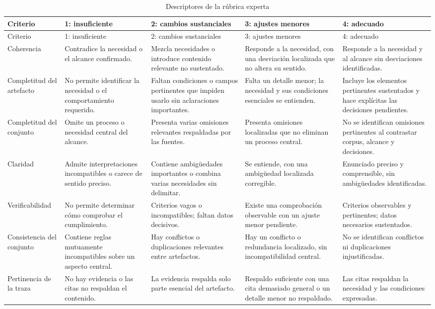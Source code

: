 \begingroup
\small
\setlength{\tabcolsep}{4pt}
\begin{longtable}{p{}p{}p{}p{}p{}}
  \caption{Descriptores de la rúbrica experta}
  \label{tab:rubrica-expertos}\\
  \toprule
  Criterio & 1: insuficiente & 2: cambios sustanciales & 3: ajustes menores & 4: adecuado \\
  \midrule
  \endfirsthead
  \toprule
  Criterio & 1: insuficiente & 2: cambios sustanciales & 3: ajustes menores & 4: adecuado \\
  \midrule
  \endhead
  Coherencia & Contradice la necesidad o el alcance confirmado. & Mezcla necesidades o introduce contenido relevante no sustentado. & Responde a la necesidad, con una desviación localizada que no altera su sentido. & Responde a la necesidad y al alcance sin desviaciones identificadas. \\
  Completitud del artefacto & No permite identificar la necesidad o el comportamiento requerido. & Faltan condiciones o campos pertinentes que impiden usarlo sin aclaraciones importantes. & Falta un detalle menor; la necesidad y sus condiciones esenciales se entienden. & Incluye los elementos pertinentes sustentados y hace explícitas las decisiones pendientes. \\
  Completitud del conjunto & Omite un proceso o necesidad central del alcance. & Presenta varias omisiones relevantes respaldadas por las fuentes. & Presenta omisiones localizadas que no eliminan un proceso central. & No se identifican omisiones pertinentes al contrastar corpus, alcance y decisiones. \\
  Claridad & Admite interpretaciones incompatibles o carece de sentido preciso. & Contiene ambigüedades importantes o combina varias necesidades sin delimitar. & Se entiende, con una ambigüedad localizada corregible. & Enunciado preciso y comprensible, sin ambigüedades identificadas. \\
  Verificabilidad & No permite determinar cómo comprobar el cumplimiento. & Criterios vagos o incompatibles; faltan datos decisivos. & Existe una comprobación observable con un ajuste menor pendiente. & Criterios observables y pertinentes; datos necesarios sustentados. \\
  Consistencia del conjunto & Contiene reglas mutuamente incompatibles sobre un aspecto central. & Hay conflictos o duplicaciones relevantes entre artefactos. & Hay un conflicto o redundancia localizado, sin incompatibilidad central. & No se identifican conflictos ni duplicaciones injustificadas. \\
  Pertinencia de la traza & No hay evidencia o las citas no respaldan el contenido. & La evidencia respalda solo parte esencial del artefacto. & Respaldo suficiente con una cita demasiado general o un detalle menor no respaldado. & Las citas respaldan la necesidad y las condiciones expresadas. \\
  \bottomrule
\end{longtable}
\endgroup

